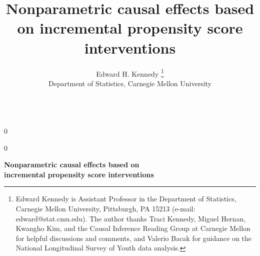 \documentclass[12pt]{article}
\newcommand{\blind}{0}
\theoremstyle{remark}
\begin{document}
\def\spacingset#1{\renewcommand{\baselinestretch}%
{#1}\small\normalsize} \spacingset{1}


\blind
{
  \title{ \bf Nonparametric causal effects based on incremental propensity score interventions}
    \author{Edward H. Kennedy
    \thanks{Edward Kennedy is Assistant Professor in the Department of Statistics, Carnegie Mellon University, Pittsburgh, PA 15213 (e-mail: edward@stat.cmu.edu). The author thanks Traci Kennedy, Miguel Hernan, Kwangho Kim, and the Causal Inference Reading Group at Carnegie Mellon 
    for helpful discussions and comments, and Valerio Bacak for guidance on the National Longitudinal Survey of Youth data analysis.}\hspace{.2cm}
    \\
    Department of Statistics, Carnegie Mellon University \\ \\
    }
  \maketitle
  \setcounter{page}{0}
  \thispagestyle{empty}
} \fi

\blind
{
  \vspace*{.8in}
  \begin{center}
    {\LARGE\bf Nonparametric causal effects based on \\ \vspace{.15in} incremental propensity score interventions  }
\end{center}
  \setcounter{page}{0}
  \medskip
} \fi
\end{document}
